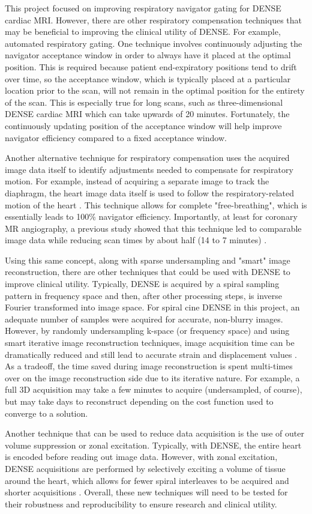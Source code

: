 	This project focused on improving respiratory navigator gating for DENSE cardiac MRI. However, there are other respiratory compensation techniques that may be beneficial to improving the clinical utility of DENSE. For example, automated respiratory gating. One technique involves continuously adjusting the navigator acceptance window in order to always have it placed at the optimal position. This is required because patient end-expiratory positions tend to drift over time, so the acceptance window, which is typically placed at a particular location prior to the scan, will not remain in the optimal position for the entirety of the scan. This is especially true for long scans, such as three-dimensional DENSE cardiac MRI which can take upwards of 20 minutes. Fortunately, the continuously updating position of the acceptance window will help improve navigator efficiency compared to a fixed acceptance window.
	
	Another alternative technique for respiratory compensation uses the acquired image data itself to identify adjustments needed to compensate for respiratory motion. For example, instead of acquiring a separate image to track the diaphragm, the heart image data itself is used to follow the respiratory-related motion of the heart \cite{Pang2014}. This technique allows for complete "free-breathing", which is essentially leads to 100\% navigator efficiency. Importantly, at least for coronary MR angiography, a previous study showed that this technique led to comparable image data while reducing scan times by about half (14 to 7 minutes) \cite{Pang2014}.
	
	Using this same concept, along with sparse undersampling and "smart" image reconstruction, there are other techniques that could be used with DENSE to improve clinical utility. Typically, DENSE is acquired by a spiral sampling pattern in frequency space and then, after other processing steps, is inverse Fourier transformed into image space. For spiral cine DENSE in this project, an adequate number of samples were acquired for accurate, non-blurry images. However, by randomly undersampling k-space (or frequency space) and using smart iterative image reconstruction techniques, image acquisition time can be dramatically reduced and still lead to accurate strain and displacement values \cite{Chen2013}. As a tradeoff, the time saved during image reconstruction is spent multi-times over on the image reconstruction side due to its iterative nature. For example, a full 3D acquisition may take a few minutes to acquire (undersampled, of course), but may take days to reconstruct depending on the cost function used to converge to a solution.
	
	Another technique that can be used to reduce data acquisition is the use of outer volume suppression or zonal excitation. Typically, with DENSE, the entire heart is encoded before reading out image data. However, with zonal excitation, DENSE acquisitions are performed by selectively exciting a volume of tissue around the heart, which allows for fewer spiral interleaves to be acquired and shorter acquisitions \cite{Scott2016}. Overall, these new techniques will need to be tested for their robustness and reproducibility to ensure research and clinical utility.

	
	
	